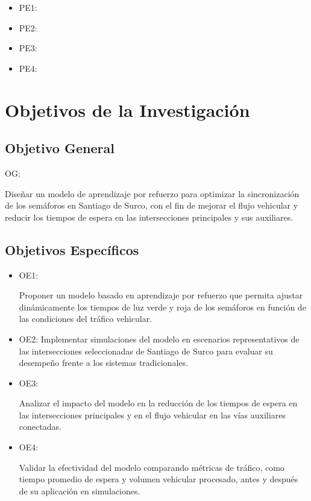 \begin{itemize}
	\item PE1: {\Pbone}
	\item PE2: {\Pbtwo}
	\item PE3: {\Pbthree}
	\item PE4: {\Pbfour}
\end{itemize}

\section{Objetivos de la Investigación}

\subsection{Objetivo General}
OG: \newcommand{\ObjetivoGeneral}{
Diseñar un modelo de aprendizaje por refuerzo para optimizar la sincronización de los semáforos en Santiago de Surco, con el fin de mejorar el flujo vehicular y reducir los tiempos de espera en las intersecciones principales y sus auxiliares.
}
\ObjetivoGeneral
\subsection{Objetivos Específicos}
\newcommand{\Objone}{
Proponer un modelo basado en aprendizaje por refuerzo que permita ajustar dinámicamente los tiempos de luz verde y roja de los semáforos en función de las condiciones del tráfico vehicular.

}
\newcommand{\Objtwo}{
Implementar simulaciones del modelo en escenarios representativos de las intersecciones seleccionadas de Santiago de Surco para evaluar su desempeño frente a los sistemas tradicionales.
}
\newcommand{\Objthree}{

Analizar el impacto del modelo en la reducción de los tiempos de espera en las intersecciones principales y en el flujo vehicular en las vías auxiliares conectadas.
}
\newcommand{\Objfour}{

Validar la efectividad del modelo comparando métricas de tráfico, como tiempo promedio de espera y volumen vehicular procesado, antes y después de su aplicación en simulaciones.
}

\begin{itemize}
	\item OE1: {\Objone}
	\item OE2: {\Objtwo}
	\item OE3: {\Objthree}
	\item OE4: {\Objfour}
\end{itemize}



